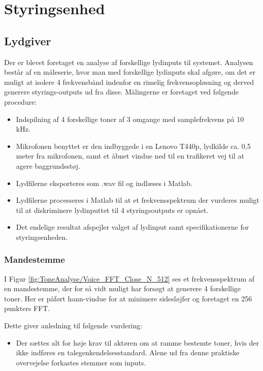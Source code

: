 {
\def\dirfigs{figs/Analyse/Styringsenhed/}
\section{Styringsenhed}\label{sec:Styringsenhed:analyse}
\subsection{Lydgiver}\label{subsubsec:Styringsenhed:analyse:Lydgiver}
Der er blevet foretaget en analyse af forskellige lydinputs til systemet. Analysen består af en måleserie, hvor man med forskellige lydinputs skal afgøre, om det er muligt at isolere 4 frekvensbånd indenfor en rimelig frekvensopløsning og derved generere styrings-outputs ud fra disse. Målingerne er foretaget ved følgende procedure:
\begin{itemize}
    \item Indspilning af 4 forskellige toner af 3 omgange med samplefrekvens på 10 kHz.
    \item Mikrofonen benyttet er den indbyggede i en Lenovo T440p, lydkilde ca. 0,5 meter fra mikrofonen, samt et åbnet vindue ned til en trafikeret vej til at agere baggrundsstøj.
    \item Lydfilerne eksporteres som .wav fil og indlæses i Matlab.
    \item Lydfilerne processeres i Matlab til at et frekvensspektrum der vurderes muligt til at diskriminere lydinputtet til 4 styringsoutputs er opnået. 
    \item Det endelige resultat afspejler valget af lydinput samt specifikationerne for styringsenheden.
\end{itemize}

\subsubsection{Mandestemme}

I Figur \ref{fig:ToneAnalyse/Voice_FFT_Close_N_512} ses et frekvensspektrum af en mandestemme, der for så vidt muligt har forsøgt at generere 4 forskellige toner. Her er påført hann-vindue for at minimere sidesløjfer og foretaget en 256 punkters FFT.

Dette giver anledning til følgende vurdering:
\begin{itemize}
    \item Der sættes alt for høje krav til aktøren om at ramme bestemte toner, hvis der ikke indføres en talegenkendelsesstandard. Alene ud fra denne praktiske overvejelse forkastes stemmer som inputs. 
\end{itemize}
}
